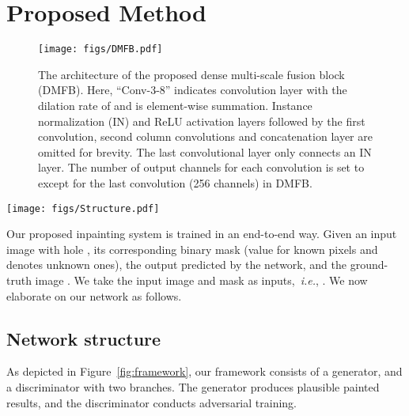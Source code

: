 \documentclass[journal]{IEEEtran}
\newcommand{\ie}{\emph{i.e.}}
\begin{document}
\section{Proposed Method}\label{sec:proposed-method}
\begin{figure}[htpb]
	\begin{center}
		\texttt{[image: figs/DMFB.pdf]}
	\end{center}
	\caption{The architecture of the proposed dense multi-scale fusion block (DMFB). Here, ``Conv-3-8'' indicates  convolution layer with the dilation rate of  and  is element-wise summation. Instance normalization (IN) and ReLU activation layers followed by the first convolution, second column convolutions and concatenation layer are omitted for brevity. The last convolutional layer only connects an IN layer. The number of output channels for each convolution is set to  except for the last  convolution (256 channels) in DMFB.} 
	\label{fig:DMFB}
\end{figure}

\begin{figure*}[htpb]
	\begin{center}
		\texttt{[image: figs/Structure.pdf]}
	\end{center}
	\caption{The framework of our method. The activation layer followed by each ``convolution + norm'' or convolution layer in the generator is omitted for conciseness. The activation function adopts ReLU except for the last convolution (Tanh) in the generator. \textcolor{blue}{Blue} dotted box indicates our upsampler module (TConv-4 is  transposed convolution) and  ``'' denotes the stride of 2.}
	\label{fig:framework}
\end{figure*}

Our proposed inpainting system is trained in an end-to-end way. Given an input image with hole , its corresponding binary mask  (value  for known pixels and 
 denotes unknown ones), the output  predicted by the network, and the ground-truth image . We take the input image and mask as inputs,~\ie, . We now elaborate on our network as follows.

\subsection{Network structure}
As depicted in Figure~\ref{fig:framework}, our framework consists of a generator, and a discriminator with two branches. The generator produces plausible painted results, and the discriminator conducts adversarial training. 
\end{document}
